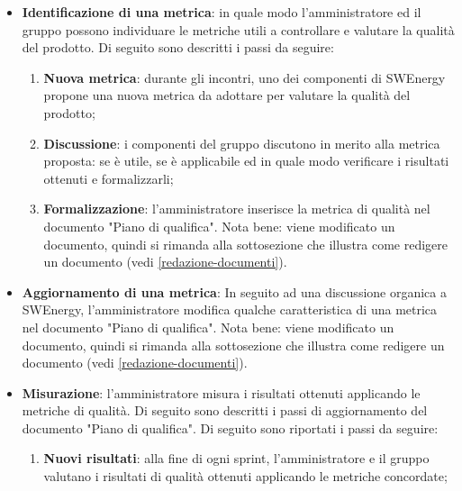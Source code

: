 \begin{itemize}
	\item \textbf{Identificazione di una metrica}: in quale modo
	      l'amministratore ed il gruppo possono individuare le metriche utili a
	      controllare e valutare la qualità del prodotto. Di seguito sono
	      descritti i passi da seguire:
	      \begin{enumerate}
		      \item \textbf{Nuova metrica}: durante gli incontri, uno dei
		            componenti di SWEnergy propone una nuova metrica da adottare
		            per valutare la qualità del prodotto;

		      \item \textbf{Discussione}: i componenti del gruppo discutono in
		            merito alla metrica proposta: se è utile, se è applicabile
		            ed in quale modo verificare i risultati ottenuti e
		            formalizzarli;

		      \item \textbf{Formalizzazione}: l'amministratore inserisce la
		            metrica di qualità nel documento "Piano di qualifica". Nota
		            bene: viene modificato un documento, quindi si rimanda alla
		            sottosezione che illustra come redigere un documento
		            (vedi \autoref{redazione-documenti}).
	      \end{enumerate}

	\item \textbf{Aggiornamento di una metrica}: In seguito ad una discussione
	      organica a SWEnergy, l'amministratore modifica qualche caratteristica
	      di una metrica nel documento "Piano di qualifica". Nota bene:
	      viene modificato un documento, quindi si rimanda alla
	      sottosezione che illustra come redigere un documento
	      (vedi \autoref{redazione-documenti}).

	\item \textbf{Misurazione}: l'amministratore misura i risultati ottenuti
	      applicando le metriche di qualità. Di seguito sono descritti i passi
	      di aggiornamento del documento "Piano di qualifica". Di seguito sono
	      riportati i passi da seguire:
	      \begin{enumerate}
		      \item \textbf{Nuovi risultati}: alla fine di ogni sprint,
		            l'amministratore e il gruppo valutano i risultati di qualità
		            ottenuti applicando le metriche concordate;


\end{enumerate}
\end{itemize}
